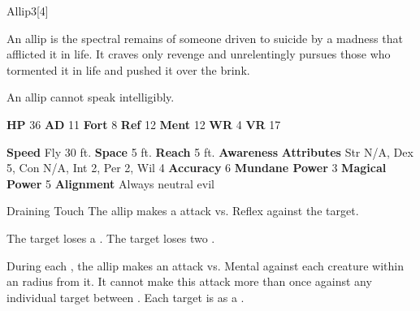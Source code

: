       
  \begin{monsection}{Allip}{3}[4]
    \vspace{-1em}\vspace{-1em}
    \vspace{0em}

    
      An allip is the spectral remains of someone driven to suicide by a madness that afflicted it in life.
      It craves only revenge and unrelentingly pursues those who tormented it in life and pushed it over the brink.

      An allip cannot speak intelligibly.
    
    

    \begin{spellcontent}
      \begin{spelltargetinginfo}
        \pari \textbf{HP} 36 \monsep
          \textbf{AD} 11 \monsep
          \textbf{Fort} 8 \monsep
          \textbf{Ref} 12 \monsep
          \textbf{Ment} 12
        \pari \textbf{WR} 4 \monsep
        \textbf{VR} 17
        
      \end{spelltargetinginfo}
    \end{spellcontent}
    \begin{monsterfooter}
      \pari \textbf{Speed} Fly 30 ft. \monsep
        \textbf{Space} 5 ft. \monsep
        \textbf{Reach} 5 ft.
      \pari \textbf{Awareness} 
      \pari \textbf{Attributes}
        Str N/A, Dex 5,
        Con N/A, Int 2,
        Per 2, Wil 4
      \pari \textbf{Accuracy} 6 \monsep
        \textbf{Mundane Power} 3 \monsep
      \textbf{Magical Power} 5
      \pari \textbf{Alignment} Always neutral evil
    \end{monsterfooter}
  \end{monsection}
  \begin{freeability}{Draining Touch}
       The allip makes a  attack
        vs. Reflex against the target.
    
    \hit The target loses a .
    \crit The target loses two .
    \end{freeability}
  
          During each , the allip makes an attack vs. Mental against each creature
          within an \arealarge radius  from it.
          It cannot make this attack more than once against any individual target between .
          \hit Each target is  as a .
        
